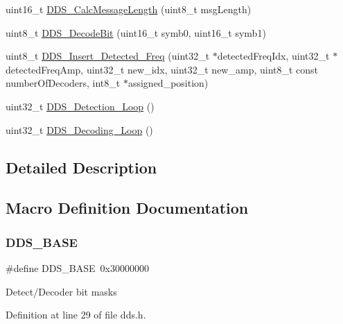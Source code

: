 \begin{DoxyCompactItemize}
uint16\+\_\+t \hyperlink{group___d_d_s___a_p_i_ga3c1b6aafe67b4074170688cf170fad65}{D\+D\+S\+\_\+\+Calc\+Message\+Length} (uint8\+\_\+t msg\+Length)
\item 
uint8\+\_\+t \hyperlink{group___d_d_s___a_p_i_ga249a36f3fa12baff1cf03b7f6a8a0cac}{D\+D\+S\+\_\+\+Decode\+Bit} (uint16\+\_\+t symb0, uint16\+\_\+t symb1)
\item 
uint8\+\_\+t \hyperlink{group___d_d_s___a_p_i_ga50f75e7c6ac13f3ce0acd05055506455}{D\+D\+S\+\_\+\+Insert\+\_\+\+Detected\+\_\+\+Freq} (uint32\+\_\+t $\ast$detected\+Freq\+Idx, uint32\+\_\+t $\ast$detected\+Freq\+Amp, uint32\+\_\+t new\+\_\+idx, uint32\+\_\+t new\+\_\+amp, uint8\+\_\+t const number\+Of\+Decoders, int8\+\_\+t $\ast$assigned\+\_\+position)
\item 
uint32\+\_\+t \hyperlink{group___d_d_s___a_p_i_ga1f53b4fdeb56f560600428473023f819}{D\+D\+S\+\_\+\+Detection\+\_\+\+Loop} ()
\item 
uint32\+\_\+t \hyperlink{group___d_d_s___a_p_i_ga0d11598fca2a9f0eceb43f06a0fb2c4e}{D\+D\+S\+\_\+\+Decoding\+\_\+\+Loop} ()
\end{DoxyCompactItemize}


\subsection{Detailed Description}


\subsection{Macro Definition Documentation}
\mbox{\label{group___d_d_s___a_p_i_gaae9812f46efd3711214d66ec5bd90674}} 
\subsubsection{\texorpdfstring{D\+D\+S\+\_\+\+B\+A\+SE}{DDS\_BASE}}
{\footnotesize\ttfamily \#define D\+D\+S\+\_\+\+B\+A\+SE~0x30000000}

Detect/\+Decoder bit masks 

Definition at line 29 of file dds.\+h.

\mbox{\label{group___d_d_s___a_p_i_ga61f7ba6d9616f3c1b1dd1ac799428fd1}} 
